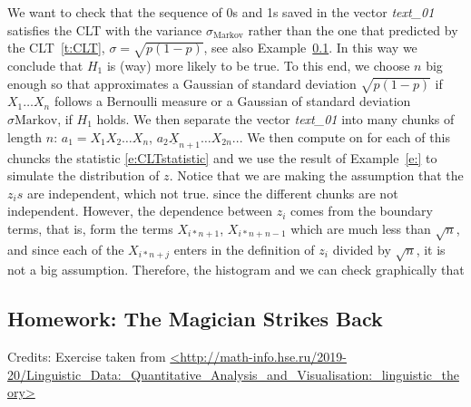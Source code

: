 	We want to check that the sequence of 0s and 1s saved in the vector \textit{text\_01} satisfies the CLT with the variance $\sigma_{\text{Markov}}$ rather than the one that predicted by the CLT~\ref{t:CLT}, $\sigma = \sqrt{p(1-p)}$, see also Example~\ref{}. In this way we conclude that $H_1$ is (way) more likely to be true.    
	To this end, we choose $n$ big enough so that 
	approximates a Gaussian of standard deviation $\sqrt{p(1-p)}$ if $X_1\ldots X_n$ follows a Bernoulli measure or a Gaussian of standard deviation $\sigma{\text{Markov}}$, if $H_1$ holds. We then separate the vector \textit{text\_01} into many chunks of length $n$: $a_1 = X_1X_2\ldots X_n$, $a_2 \underline X_{n+1}\ldots X_{2n}$...
	We then compute on for each of this chuncks the statistic \eqref{e:CLTstatistic}
	 and we use the result of Example~\ref{e:} to simulate the distribution of $z$. Notice that we are making the assumption that the $z_is$ are independent, which not true. since the different chunks are not independent. However, the dependence between $z_i$ comes from the boundary terms, that is, form the terms $X_{i*n + 1}$, $X_{i*n + n-1 }$ which are much less than $\sqrt{n}$, and since each of the $X_{i*n+ j}$ enters in the definition of $z_i$ divided by $\sqrt{n}$, it is not a big assumption. 
	Therefore, the histogram and we can check graphically that 
   
	\subsection{ Homework: The Magician Strikes Back}
	
	Credits: Exercise taken from \url{<http://math-info.hse.ru/2019-20/Linguistic_Data:_Quantitative_Analysis_and_Visualisation:_linguistic_theory>}
	

